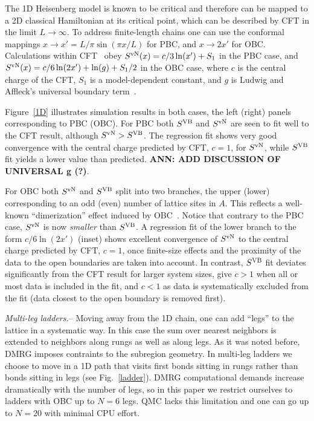 \documentclass[prl,aps,twocolumn,floatfix,amsmath,amssymb,superscriptaddress,tightenlines]{revtex4}
\begin{document}
The 1D Heisenberg model is known to be critical and therefore can be
mapped to a 2D classical Hamiltonian at its critical point, which
can be described by CFT in the limit $L\to\infty$.  To address
finite-length chains one can use the conformal mappings $x\to x'=L/\pi
\sin(\pi x / L)$ for PBC, and 
$x\to 2x'$ for OBC. %
Calculations within CFT~\cite{Cardy} obey $S^{\rm vN}(x)= c/3
\ln(x') + S_1$ in the PBC case, and $S^{\rm vN}(x)= c/6 \ln(2x') +
\ln(g)+S_1/2$ in the OBC case, where $c$ is the central charge of the CFT,
$S_1$ is a model-dependent constant, and $g$ is Ludwig and Affleck's
universal boundary term~\cite{AffleckAndLudwig}.

Figure~\ref{1D} illustrates simulation results in both cases, the left
(right) panels corresponding to PBC (OBC). 
For PBC both
$S^{\rm VB}$ and $S^{ \rm vN}$ are seen to fit well to the CFT result, although
$S^{ \rm vN} > S^{\rm VB}$. The regression fit shows very good
convergence with the central charge predicted by CFT, $c=1$, for $S^{ \rm vN}$, while
$S^{\rm VB}$ fit yields a lower value than predicted.
{\bf ANN: ADD DISCUSSION OF UNIVERSAL g (?)}.  

For OBC both $S^{ \rm vN}$ and $S^{\rm VB}$ split into two branches, the upper (lower)
corresponding to an odd (even) number of lattice sites in $A$.  This
reflects a well-known ``dimerization'' effect induced by OBC~\cite{Ian1}.
Notice that contrary to the PBC case, $S^{ \rm vN}$ is now \textit{smaller}
than $S^{\rm VB}$. A regression fit of the lower branch to the form $c/6 \ln
({2x'})$ (inset) shows excellent convergence of $S^{ \rm vN}$ to the central
charge predicted by CFT, $c=1$, once finite-size effects and the proximity
of the data to the open boundaries are taken into account.  In contrast,
$S^{\rm VB}$ fit deviates significantly from the CFT result for larger system
sizes, give $c>1$ when all or most data is included in the fit, and $c<1$
as data is systematically excluded from the fit (data closest to the open
boundary is removed first).

{\it Multi-leg ladders.}-- Moving away from the 1D chain, one can add
``legs'' to the lattice in a systematic way. In this case the sum over
nearest neighbors is extended to neighbors along rungs as well as along
legs.  As it was noted before, DMRG imposes contraints to the subregion
geometry. In multi-leg ladders we choose to move in a 1D path that visits
first bonds sitting in rungs rather than bonds sitting in legs (see
Fig.~\ref{ladder}).  DMRG computational demands increase dramatically with
the number of legs, so in this paper we restrict ourselves to ladders with
OBC up to $N=6$ legs. QMC lacks this limitation and one can go up to
$N=20$ with minimal CPU effort.
\end{document}
